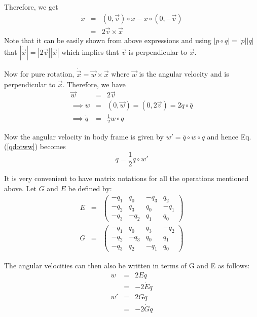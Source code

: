 \documentclass{article}
\begin{document}
	Therefore, we get
	\begin{eqnarray}
		\dot{x} &=& (0,\vec{v})\circ x - x\circ (0,-\vec{v})\\
		&=&2\vec{v}\times \vec{x}
	\end{eqnarray}
	Note that it can be easily shown from above expressions and using $|p\circ q|=|p||q|$ that $|\dot{\vec{x}}|=|2\vec{v}||\vec{x}|$ which implies that $\vec{v}$ is perpendicular to $\vec{x}$.
	
	Now for pure rotation, $\dot{\vec{x}} = \vec{w}\times \vec{x}$ where $\vec{w}$ is the angular velocity and is perpendicular to $\vec{x}$. Therefore, we have	
	\begin{eqnarray}
	\vec{w} &=& 2\vec{v}\\
	\implies w &=& (0,\vec{w}) = (0,2\vec{v}) = 2\dot{q}\circ \bar{q}\\
	\implies \dot{q} &=& \frac{1}{2}w\circ q
	\label{qdotww}
	\end{eqnarray}
	
	Now the angular velocity in body frame is given by $w' = \bar{q}\circ w\circ q$ and hence Eq.(\ref{qdotww}) becomes
	\begin{equation}
		\dot{q} = \frac{1}{2}q\circ w'
	\end{equation}
	
	
	
	It is very convenient to have matrix notations for all the operations mentioned above. Let $G$ and $E$ be defined by:
	\begin{eqnarray}
	E &=& \begin{pmatrix}
	-q_1& q_0& -q_3& q_2\\
	-q_2 &q_3 &q_0 &-q_1\\
	-q_3 &-q_2 &q_1& q_0
	\end{pmatrix}\\
	G &=& \begin{pmatrix}
	-q_1& q_0& q_3& -q_2\\
	-q_2 &-q_3 &q_0 &q_1\\
	-q_3 &q_2& -q_1& q_0
	\end{pmatrix}
	\end{eqnarray}
	
	The angular velocities can then also be written in terms of G and E as follows:
	\begin{eqnarray}
	w &=& 2E\dot{q}\\
	&=&-2\dot{E}q\\
	w' &=& 2G\dot{q}\\
	&=& -2\dot{G}q
	\end{eqnarray}
	
\end{document}
